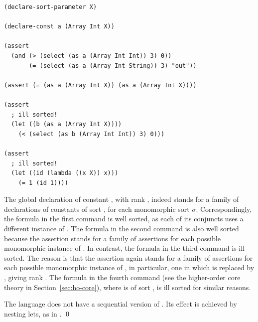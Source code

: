 \begin{lstlisting}[linewidth = 38em]
(declare-sort-parameter X)

(declare-const a (Array Int X))

(assert 
  (and (> (select (as a (Array Int Int)) 3) 0))
       (= (select (as a (Array Int String)) 3) "out"))

(assert (= (as a (Array Int X)) (as a (Array Int X))))

(assert 
  ; ill sorted!
  (let ((b (as a (Array Int X))))
    (< (select (as b (Array Int Int)) 3) 0)))
    
(assert 
  ; ill sorted!
  (let ((id (lambda ((x X)) x)))
    (= 1 (id 1))))

\end{lstlisting}

\noindent
The global declaration of constant , with rank ,
indeed stands for a family of declarations of constants of sort 
, for each monomorphic sort $\sigma$.
Correspondingly, the formula in the first  command is well sorted,
as each of its conjuncts uses a different instance of .
%
The formula in the second  command is also well sorted
because the assertion stands for a family of assertions 
for each possible monomorphic instance of .
%
In contrast, the formula in the third  command is ill sorted.
The reason is that the assertion again stands for a family of assertions 
for each possible monomorphic instance of ,
in particular, one in which  is replaced by ,
giving  rank .
%
The formula in the fourth  command
(see the higher-order core theory in Section~\ref{sec:ho-core}),
where  is of sort ,
is ill sorted for similar reasons.

\begin{remark}
The language does not have a sequential version of .
Its effect is achieved by nesting lets, as in 
.
\qed
\end{remark}

